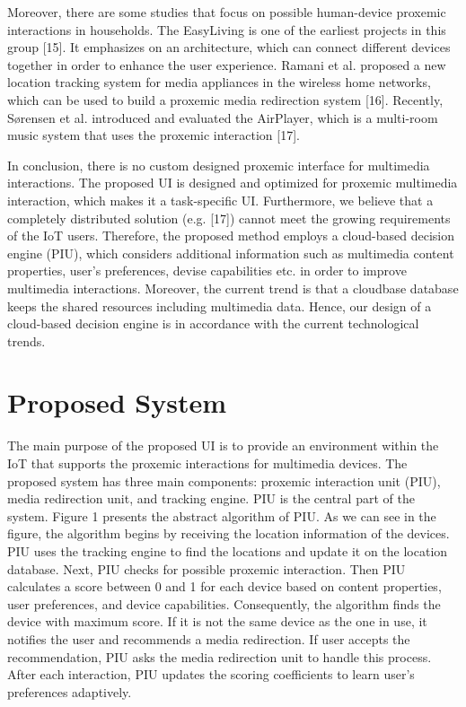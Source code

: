 \documentclass[]{IEEEphot}
\begin{document}
Moreover, there are some studies that focus on possible human-device proxemic interactions in households. The EasyLiving is one of the earliest projects
in this group [15]. It emphasizes on an architecture, which can connect different
devices together in order to enhance the user experience. Ramani et al. proposed
a new location tracking system for media appliances in the wireless home networks, which can be used to build a proxemic media redirection system [16].
Recently, Sørensen et al. introduced and evaluated the AirPlayer, which is a
multi-room music system that uses the proxemic interaction [17].



In conclusion, there is no custom designed proxemic interface for multimedia
interactions. The proposed UI is designed and optimized for proxemic multimedia interaction, which makes it a task-specific UI. Furthermore, we believe that
a completely distributed solution (e.g. [17]) cannot meet the growing requirements of the IoT users. Therefore, the proposed method employs a cloud-based
decision engine (PIU), which considers additional information such as multimedia content properties, user’s preferences, devise capabilities etc. in order to
improve multimedia interactions. Moreover, the current trend is that a cloudbase database keeps the shared resources including multimedia data. Hence, our
design of a cloud-based decision engine is in accordance with the current technological trends.

\section{ Proposed System}

The main purpose of the proposed UI is to provide an environment within the
IoT that supports the proxemic interactions for multimedia devices. The proposed system has three main components: proxemic interaction unit (PIU), media redirection unit, and tracking engine. PIU is the central part of the system.
Figure 1 presents the abstract algorithm of PIU. As we can see in the figure, the
algorithm begins by receiving the location information of the devices. PIU uses
the tracking engine to find the locations and update it on the location database.
Next, PIU checks for possible proxemic interaction. Then PIU calculates a score
between 0 and 1 for each device based on content properties, user preferences,
and device capabilities. Consequently, the algorithm finds the device with maximum score. If it is not the same device as the one in use, it notifies the user and
recommends a media redirection. If user accepts the recommendation, PIU asks
the media redirection unit to handle this process. After each interaction, PIU
updates the scoring coefficients to learn user’s preferences adaptively.
\end{document}
